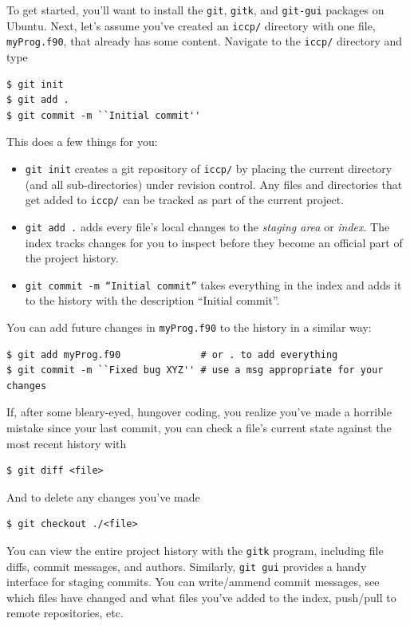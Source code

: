 \documentclass[openany,oneside]{report}
\begin{document}
To get started, you'll want to install the \texttt{git}, \texttt{gitk}, and \texttt{git-gui} packages on Ubuntu. Next, let's assume you've created an \texttt{iccp/} directory with one file, \texttt{myProg.f90}, that already has some content. Navigate to the \texttt{iccp/} directory and type
\begin{verbatim}
$ git init
$ git add .
$ git commit -m ``Initial commit''
\end{verbatim}
This does a few things for you:
\begin{itemize}
  \item \texttt{git init} creates a git repository of \texttt{iccp/} by placing the current directory (and all sub-directories) under revision control.
    Any files and directories that get added to \texttt{iccp/} can be tracked as part of the current project.
  \item \texttt{git add .} adds every file's local changes to the \emph{staging area} or \emph{index}.
    The index tracks changes for you to inspect before they become an official part of the project history.
  \item \texttt{git commit -m ``Initial commit''} takes everything in the index and adds it to the history with the description ``Initial commit''.
\end{itemize}
You can add future changes in \texttt{myProg.f90} to the history in a similar way:
\begin{verbatim}
$ git add myProg.f90              # or . to add everything
$ git commit -m ``Fixed bug XYZ'' # use a msg appropriate for your changes
\end{verbatim}
If, after some bleary-eyed, hungover coding, you realize you've made a horrible mistake since your last commit, you can check a file's current state against the most recent history with
\begin{verbatim}
$ git diff <file>
\end{verbatim}
And to delete any changes you've made
\begin{verbatim}
$ git checkout ./<file>
\end{verbatim}
You can view the entire project history with the \texttt{gitk} program, including file diffs, commit messages, and authors. Similarly, \texttt{git gui} provides a handy interface for staging commits. You can write/ammend commit messages, see which files have changed and what files you've added to the index, push/pull to remote repositories, etc.
\end{document}
